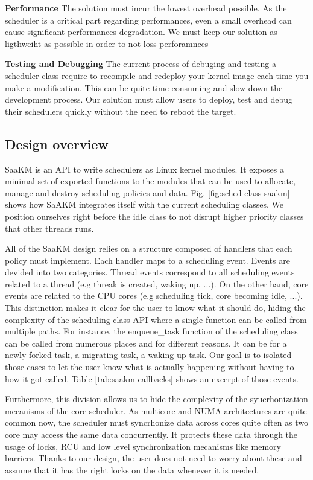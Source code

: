 \textbf{Performance} The solution must incur the lowest overhead possible. As the scheduler is a critical part regarding performances, even a small overhead can cause significant performances degradation. We must keep our solution as ligthweiht as possible in order to not loss perforamnces

\textbf{Testing and Debugging} The current process of debuging and testing a scheduler class require to recompile and redeploy your kernel image each time you make a modification. This can be quite time consuming and slow down the development process. Our solution must allow users to deploy, test and debug their schedulers quickly without the need to reboot the target.
\subsection{Design overview}
SaaKM is an API to write schedulers as Linux kernel modules. It exposes a minimal set of exported functions to the modules that can be used to allocate, manage and destroy scheduling policies and data. Fig. \ref{fig:sched-class-saakm} shows how SaAKM integrates itself with the current scheduling classes. We position ourselves right before the idle class to not disrupt higher priority classes that other threads runs.

All of the SaaKM design relies on a structure composed of handlers that each policy must implement. Each handler maps to a scheduling event. Events are devided into two categories. Thread events correspond to all scheduling events related to a thread (e.g threak is created, waking up, ...). On the other hand, core events are related to the CPU cores (e.g scheduling tick, core becoming idle, ...). This distinction makes it clear for the user to know what it should do, hiding the complexity of the scheduling class API where a single function can be called from multiple paths. For instance, the enqueue\_task function of the scheduling class can be called from numerous places and for different reasons. It can be for a newly forked task, a migrating task, a waking up task. Our goal is to isolated those cases to let the user know what is actually happening without having to how it got called. Table \ref{tab:saakm-callbacks} shows an excerpt of those events.

Furthermore, this division allows us to hide the complexity of the syucrhonization mecanisms of the core scheduler. As multicore and NUMA architectures are quite common now, the scheduler must syncrhonize data across cores quite often as two core may access the same data concurrently. It protects these data through the usage of locks, RCU and low level synchronization mecanisms like memory barriers. Thanks to our design, the user does not need to worry about these and assume that it has the right locks on the data whenever it is needed. 

